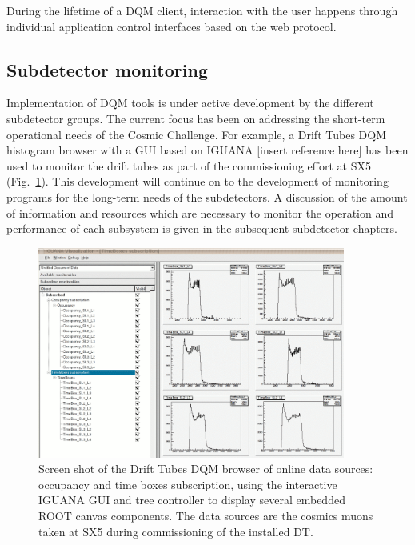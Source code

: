 \documentclass[a4paper]{cmspaper}
\begin{document}
During the lifetime of a DQM client, interaction with the user happens through individual
application control interfaces based on the web protocol.



\subsection{Subdetector monitoring}\label{sec:subdetMonitoring}

Implementation of DQM tools is under active development by
the different
subdetector groups.
The current focus has been on addressing the short-term operational
needs of the Cosmic Challenge. For example,
a Drift Tubes DQM histogram browser with
a GUI based on IGUANA [insert reference here] has been used to
monitor the drift tubes as part of the commissioning effort at SX5
(Fig.~\ref{iguana-dqm}). This development will continue
on to the development of
monitoring programs
for the long-term needs of the subdetectors. A discussion of
the amount of information and resources which are necessary to monitor the operation
and performance of each subsystem is given in the subsequent subdetector chapters.
%
%

%
\begin{figure}[!htbp]
\begin{center}
\includegraphics[width=0.9\textwidth]{iguana-dqm}
\caption{Screen shot of the Drift Tubes DQM browser of online data
sources: occupancy and time boxes subscription,
            using the interactive IGUANA  GUI and tree controller to display
            several embedded ROOT canvas components. The data sources are the cosmics muons taken at SX5
during commissioning of the installed DT.\label{iguana-dqm}}
\end{center}
\end{figure}
\end{document}
